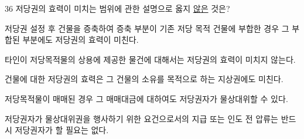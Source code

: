 \begin{question}{36}
저당권의 효력이 미치는 범위에 관한 설명으로 옳지 \uline{않은} 것은?
\begin{choices}
  \item 저당권 설정 후 건물을 증축하여 증축 부분이 기존 저당 목적 건물에 부합한 경우 그 부합된 부분에도 저당권의 효력이 미친다.
  \item 타인이 저당목적물의 상용에 제공한 물건에 대해서는 저당권의 효력이 미치지 않는다.
  \item 건물에 대한 저당권의 효력은 그 건물의 소유를 목적으로 하는 지상권에도 미친다.
  \item 저당목적물이 매매된 경우 그 매매대금에 대하여도 저당권자가 물상대위할 수 있다.
  \item 저당권자가 물상대위권을 행사하기 위한 요건으로서의 지급 또는 인도 전 압류는 반드시 저당권자가 할 필요는 없다.
\end{choices}
\end{question}
